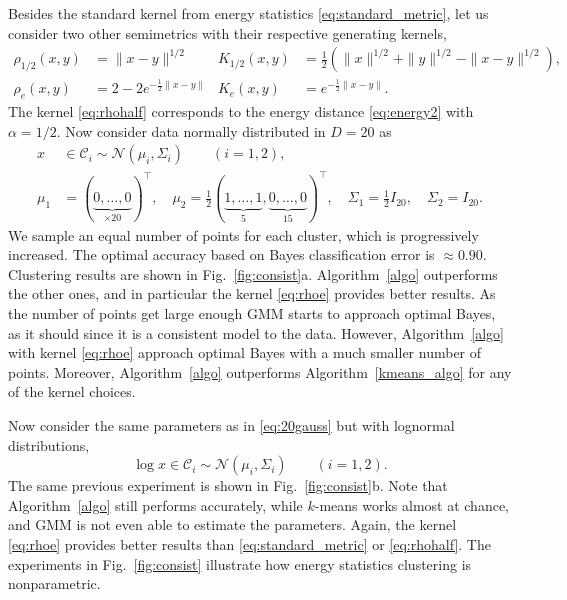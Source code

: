 \documentclass[aps,preprint,nofootinbib,floatfix]{revtex4-1}
\newcommand\kk{K}
\newcommand\C{{\mathcal{C}}}
\begin{document}
Besides the standard kernel from energy statistics 
\eqref{eq:standard_metric}, 
let us consider two other semimetrics with their respective generating
kernels,
\begin{align}
\rho_{1/2}(x,y) &= \| x-y \|^{1/2} & 
 \kk_{1/2}(x,y) &= \tfrac{1}{2} \left( 
\| x \|^{1/2} + \| y \|^{1/2} 
- \| x-y \|^{1/2} \right), \label{eq:rhohalf}\\
\rho_{e}(x,y) &= 
2 - 2 e^{-\tfrac{1}{2}\| x- y\|} &
 \kk_{e}(x,y) &= e^{-\tfrac{1}{2}\| x-y\|}.
\label{eq:rhoe}
\end{align}
The kernel \eqref{eq:rhohalf} corresponds to the energy distance
\eqref{eq:energy2} with $\alpha=1/2$.
Now consider data normally distributed in $D=20$ as
\begin{equation}
\label{eq:20gauss}
\begin{split}
x &\in \C_i \sim \mathcal{N}(\mu_i,\Sigma_i) \qquad (i=1,2), \\
\mu_1 &= (\underbrace{0,\dotsc,0}_{\times 20})^\top ,\quad
\mu_2 = \tfrac{1}{2} 
(\underbrace{1,\dotsc,1}_{5},\underbrace{0,\dotsc,0}_{15})^\top, \quad
\Sigma_1 = \tfrac{1}{2} I_{20},  \quad
\Sigma_2 = I_{20}.
\end{split}
\end{equation}
We sample an equal number of points for each cluster, which is progressively
increased. The optimal accuracy based on Bayes
classification error is $\approx 0.90$. 
Clustering results are shown in Fig.~\ref{fig:consist}a.
Algorithm~\ref{algo} outperforms the other ones, and in 
particular the kernel \eqref{eq:rhoe} provides better results.
As the number of points get large enough GMM starts to approach
optimal Bayes, as it should since it is a
consistent model to the data. However, 
Algorithm~\ref{algo} with kernel \eqref{eq:rhoe} approach optimal Bayes
with a much smaller number of points. Moreover, Algorithm~\ref{algo} 
outperforms
Algorithm~\ref{kmeans_algo} for any of the kernel choices.

Now consider the same parameters as in \eqref{eq:20gauss} but with
lognormal distributions, 
\begin{equation}
\label{eq:20loggauss}
\log x \in \C_i \sim \mathcal{N}(\mu_i, \Sigma_i) \qquad (i=1,2).
\end{equation}
The same previous experiment is shown in 
Fig.~\ref{fig:consist}b.
Note that Algorithm~\ref{algo} still performs accurately, 
while $k$-means works almost at chance,
and GMM is not even able to estimate the parameters. 
Again, the
kernel \eqref{eq:rhoe}
provides better results than \eqref{eq:standard_metric} or
\eqref{eq:rhohalf}. 
The experiments in Fig.~\ref{fig:consist}
illustrate how energy statistics clustering is nonparametric.
\end{document}
